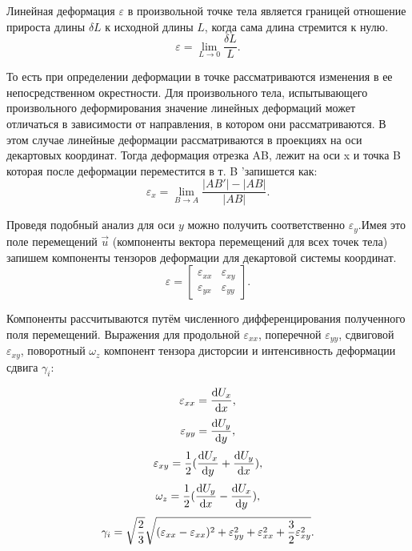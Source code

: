 Линейная деформация $\varepsilon$ в произвольной точке тела является границей отношение прироста длины $\delta L$ к исходной длины $L$, когда сама длина стремится к нулю.
\[ \varepsilon = \lim_{L \to 0} \frac{{\delta} {L}} {L}.\]

То есть при определении деформации в точке рассматриваются изменения в ее непосредственном окрестности.
Для произвольного тела, испытывающего произвольного деформирования значение линейных деформаций может отличаться в зависимости от направления, в котором они рассматриваются. В этом случае линейные деформации рассматриваются в проекциях на оси декартовых координат. Тогда деформация отрезка AB, лежит на оси x и точка B которая после деформации переместится в т. B 'запишется как:
\[ \varepsilon_x = \lim_{B \to A} {\frac{| AB '| - | AB |}{| AB |}} .\]

Проведя подобный анализ для оси $y$ можно получить соответственно $\varepsilon_y$.Имея это поле перемещений $\overrightarrow u$ (компоненты вектора перемещений для всех точек тела) запишем компоненты тензоров деформации для декартовой системы координат.
\[ \varepsilon = \left [{\begin {matrix}
{\varepsilon_{xx}} & {\varepsilon_{xy}} \\
{\varepsilon_{yx}} & {\varepsilon_{yy}}
\end{matrix}} \right].\]

Компоненты рассчитываются путём численного дифференцирования полученного поля перемещений. Выражения для продольной $\varepsilon_{xx}$, поперечной $\varepsilon_{yy}$, сдвиговой $\varepsilon_{xy}$, поворотный $\omega_z$ компонент тензора дисторсии и интенсивность деформации сдвига $\gamma_i$:

\begin{equation}
\numberwithin{equation}{section}
\label{eq:e_xx}
\varepsilon_{xx}= \frac{\mathrm{d} U_x}{\mathrm{d} x},
\end{equation}
\begin{equation}
\numberwithin{equation}{section}
\label{eq:e_yy}
\varepsilon_{yy}= \frac{\mathrm{d} U_y}{\mathrm{d} y},
\end{equation}
\begin{equation}
\numberwithin{equation}{section}
\label{eq:e_xy}
\varepsilon_{xy}=\frac{1}{2}(\frac{\mathrm{d} U_x}{\mathrm{d} y} + \frac{\mathrm{d} U_y}{\mathrm{d} x}),
\end{equation}
\begin{equation}
\numberwithin{equation}{section}
\label{eq:w_z}
\omega_z=\frac{1}{2}(\frac{\mathrm{d} U_y}{\mathrm{d} x} - \frac{\mathrm{d} U_x}{\mathrm{d} y}),
\end{equation}
\begin{equation}
\numberwithin{equation}{section}
\label{eq:gamma_i}
\gamma_i = \sqrt\frac{2}{3}\sqrt{(\varepsilon_{xx}-\varepsilon_{xx})^2+\varepsilon_{yy}^2+\varepsilon_{xx}^2 + \frac{3}{2}\varepsilon_{xy}^2}.
\end{equation}
